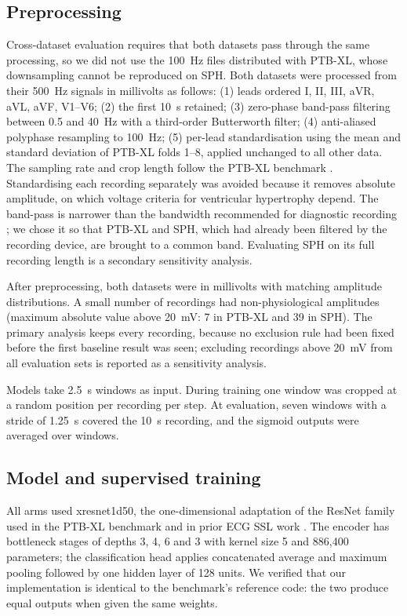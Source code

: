 \documentclass[preprint,12pt]{elsarticle}
\begin{document}
\subsection{Preprocessing}
\label{sec:preproc}

Cross-dataset evaluation requires that both datasets pass through the same processing, so we did not use the 100~Hz files distributed with PTB-XL, whose downsampling cannot be reproduced on SPH. Both datasets were processed from their 500~Hz signals in millivolts as follows: (1) leads ordered I, II, III, aVR, aVL, aVF, V1--V6; (2) the first 10~s retained; (3) zero-phase band-pass filtering between 0.5 and 40~Hz with a third-order Butterworth filter; (4) anti-aliased polyphase resampling to 100~Hz; (5) per-lead standardisation using the mean and standard deviation of PTB-XL folds 1--8, applied unchanged to all other data. The sampling rate and crop length follow the PTB-XL benchmark \cite{strodthoff2021,mehari2022}. Standardising each recording separately was avoided because it removes absolute amplitude, on which voltage criteria for ventricular hypertrophy depend. The band-pass is narrower than the bandwidth recommended for diagnostic recording \cite{kligfield2007}; we chose it so that PTB-XL and SPH, which had already been filtered by the recording device, are brought to a common band. Evaluating SPH on its full recording length is a secondary sensitivity analysis.

After preprocessing, both datasets were in millivolts with matching amplitude distributions. A small number of recordings had non-physiological amplitudes (maximum absolute value above 20~mV: 7 in PTB-XL and 39 in SPH). The primary analysis keeps every recording, because no exclusion rule had been fixed before the first baseline result was seen; excluding recordings above 20~mV from all evaluation sets is reported as a sensitivity analysis.

Models take 2.5~s windows as input. During training one window was cropped at a random position per recording per step. At evaluation, seven windows with a stride of 1.25~s covered the 10~s recording, and the sigmoid outputs were averaged over windows.

\subsection{Model and supervised training}
\label{sec:training}

All arms used xresnet1d50, the one-dimensional adaptation of the ResNet family \cite{he2016,he2019bag} used in the PTB-XL benchmark \cite{strodthoff2021} and in prior ECG SSL work \cite{mehari2022}. The encoder has bottleneck stages of depths 3, 4, 6 and 3 with kernel size 5 and 886,400 parameters; the classification head applies concatenated average and maximum pooling followed by one hidden layer of 128 units. We verified that our implementation is identical to the benchmark's reference code: the two produce equal outputs when given the same weights.
\end{document}
